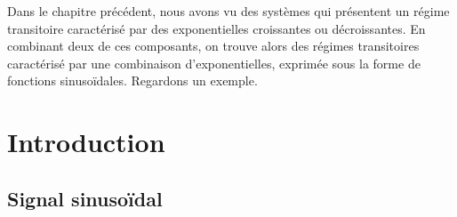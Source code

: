 \documentclass[../../main/main.tex]{subfiles}
\begin{document}
\vspace*{\fill}

Dans le chapitre précédent, nous avons vu des systèmes qui présentent un régime
transitoire caractérisé par des exponentielles croissantes ou décroissantes. En
combinant deux de ces composants, on trouve alors des régimes transitoires
caractérisé par une combinaison d'exponentielles, exprimée sous la forme de
fonctions sinusoïdales. Regardons un exemple.

\vspace*{\fill}

\newpage

\section{Introduction}

\subsection{Signal sinusoïdal}
\end{document}

